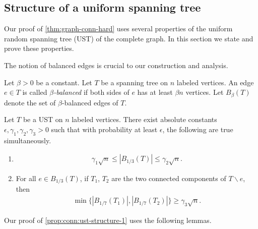 \subsection{Structure of a uniform spanning tree} \label{sec:conn:ust}
Our proof of \cref{thm:graph-conn-hard} uses several properties of the uniform random spanning tree (UST) of the complete graph.
In this section we state and prove these properties.

The notion of balanced edges is crucial to our construction and analysis.
\begin{definition} \label{defn:conn:balanced-edge}
  Let $\beta>0$ be a constant.
  Let $T$ be a spanning tree on $n$ labeled vertices.
  An edge $e\in T$ is called \emph{$\beta$-balanced} if both sides of $e$ has at least $\beta n$ vertices.
  Let $B_\beta(T)$ denote the set of $\beta$-balanced edges of $T$.
\end{definition}

\begin{proposition} \label{prop:conn:ust-structure-1}
  Let $T$ be a UST on $n$ labeled vertices.
  There exist absolute constants $\epsilon,\gamma_1,\gamma_2,\gamma_3>0$ such that with probability at least $\epsilon$, the following are true simultaneously.
  \begin{enumerate}[label=(\roman*)]
    \item\label{item:prop:conn:ust-structure-1:i}
    \begin{align*}
      \gamma_1 \sqrt n \le \left| B_{1/3}(T) \right| \le \gamma_2 \sqrt n.
    \end{align*}
    \item\label{item:prop:conn:ust-structure-1:ii} For all $e\in B_{1/3}(T)$, if $T_1$, $T_2$ are the two connected components of $T\backslash e$, then
    \begin{align*}
      \min\{\left| B_{1/7}(T_1) \right|,\left| B_{1/7}(T_2) \right|\} \ge \gamma_3 \sqrt n.
    \end{align*}
  \end{enumerate}
\end{proposition}
Our proof of \cref{prop:conn:ust-structure-1} uses the following lemmas.

